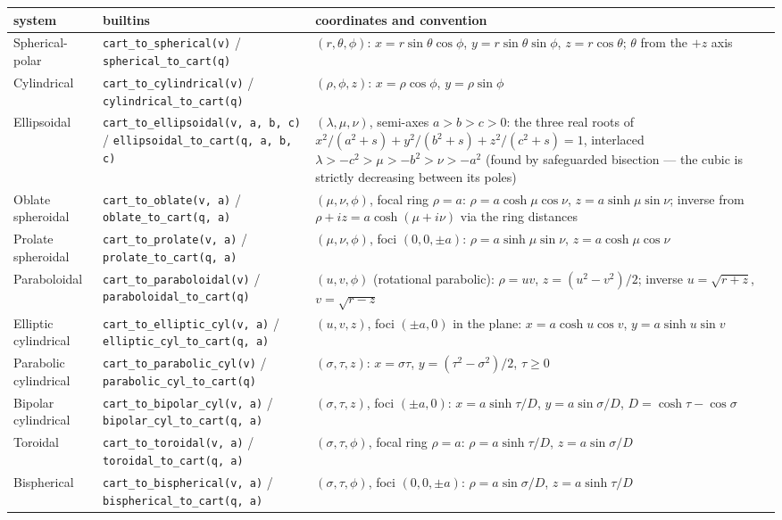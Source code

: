 \documentclass[11pt]{article}
\newcommand{\code}[1]{\texttt{#1}}
\begin{document}
\begin{center}\small
\begin{tabular}{p{2.2cm}p{4.6cm}p{7.8cm}}
\textbf{system} & \textbf{builtins} & \textbf{coordinates and convention}\\\hline
Spherical-polar & \code{cart\_to\_spherical(v)} /
  \code{spherical\_to\_cart(q)} & $(r, \theta, \phi)$:
  $x = r\sin\theta\cos\phi$, $y = r\sin\theta\sin\phi$,
  $z = r\cos\theta$; $\theta$ from the $+z$ axis\\
Cylindrical & \code{cart\_to\_cylindrical(v)} /
  \code{cylindrical\_to\_cart(q)} & $(\rho, \phi, z)$:
  $x = \rho\cos\phi$, $y = \rho\sin\phi$\\
Ellipsoidal & \code{cart\_to\_ellipsoidal(v, a, b, c)} /
  \code{ellipsoidal\_to\_cart(q, a, b, c)} & $(\lambda, \mu, \nu)$,
  semi-axes $a > b > c > 0$: the three real roots of
  $x^2/(a^2{+}s) + y^2/(b^2{+}s) + z^2/(c^2{+}s) = 1$, interlaced
  $\lambda > -c^2 > \mu > -b^2 > \nu > -a^2$ (found by safeguarded
  bisection --- the cubic is strictly decreasing between its poles)\\
Oblate spheroidal & \code{cart\_to\_oblate(v, a)} /
  \code{oblate\_to\_cart(q, a)} & $(\mu, \nu, \phi)$, focal ring
  $\rho = a$: $\rho = a\cosh\mu\cos\nu$, $z = a\sinh\mu\sin\nu$;
  inverse from $\rho + iz = a\cosh(\mu + i\nu)$ via the ring
  distances\\
Prolate spheroidal & \code{cart\_to\_prolate(v, a)} /
  \code{prolate\_to\_cart(q, a)} & $(\mu, \nu, \phi)$, foci
  $(0, 0, \pm a)$: $\rho = a\sinh\mu\sin\nu$, $z = a\cosh\mu\cos\nu$\\
Paraboloidal & \code{cart\_to\_paraboloidal(v)} /
  \code{paraboloidal\_to\_cart(q)} & $(u, v, \phi)$ (rotational
  parabolic): $\rho = uv$, $z = (u^2 - v^2)/2$; inverse
  $u = \sqrt{r + z}$, $v = \sqrt{r - z}$\\
Elliptic cylindrical & \code{cart\_to\_elliptic\_cyl(v, a)} /
  \code{elliptic\_cyl\_to\_cart(q, a)} & $(u, v, z)$, foci
  $(\pm a, 0)$ in the plane: $x = a\cosh u\cos v$,
  $y = a\sinh u\sin v$\\
Parabolic cylindrical & \code{cart\_to\_parabolic\_cyl(v)} /
  \code{parabolic\_cyl\_to\_cart(q)} & $(\sigma, \tau, z)$:
  $x = \sigma\tau$, $y = (\tau^2 - \sigma^2)/2$, $\tau \ge 0$\\
Bipolar cylindrical & \code{cart\_to\_bipolar\_cyl(v, a)} /
  \code{bipolar\_cyl\_to\_cart(q, a)} & $(\sigma, \tau, z)$, foci
  $(\pm a, 0)$: $x = a\sinh\tau/D$, $y = a\sin\sigma/D$,
  $D = \cosh\tau - \cos\sigma$\\
Toroidal & \code{cart\_to\_toroidal(v, a)} /
  \code{toroidal\_to\_cart(q, a)} & $(\sigma, \tau, \phi)$, focal
  ring $\rho = a$: $\rho = a\sinh\tau/D$, $z = a\sin\sigma/D$\\
Bispherical & \code{cart\_to\_bispherical(v, a)} /
  \code{bispherical\_to\_cart(q, a)} & $(\sigma, \tau, \phi)$, foci
  $(0, 0, \pm a)$: $\rho = a\sin\sigma/D$, $z = a\sinh\tau/D$\\
\end{tabular}
\end{center}
\end{document}
